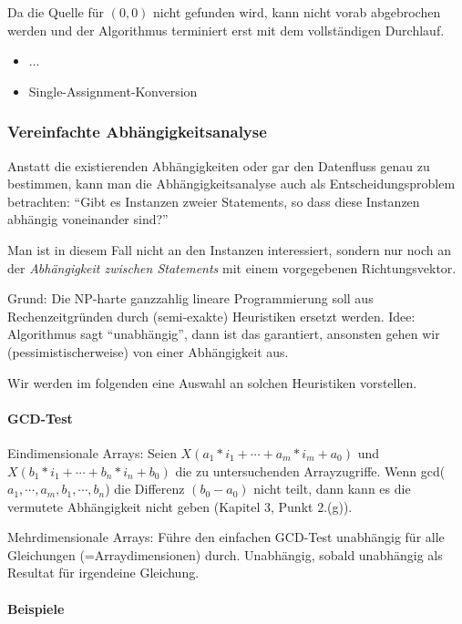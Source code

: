 Da die Quelle für \( (0,0) \) nicht gefunden wird, kann nicht vorab abgebrochen werden und der Algorithmus terminiert erst mit dem vollständigen Durchlauf.
    \begin{itemize}
        \item ...
        \item Single-Assignment-Konversion
    \end{itemize}

\subsubsection{Vereinfachte Abhängigkeitsanalyse}

Anstatt die existierenden Abhängigkeiten oder gar den Datenfluss genau
zu bestimmen, kann man die Abhängigkeitsanalyse auch als
Entscheidungsproblem betrachten: ``Gibt es Instanzen zweier
Statements, so dass diese Instanzen abhängig voneinander sind?''

Man ist in diesem Fall nicht an den Instanzen interessiert, sondern
nur noch an der \emph{Abhängigkeit zwischen Statements} mit einem
vorgegebenen Richtungsvektor.

Grund: Die NP-harte ganzzahlig lineare Programmierung soll aus
Rechenzeitgründen durch (semi-exakte) Heuristiken ersetzt werden.
Idee: Algorithmus sagt ``unabhängig'', dann ist das garantiert,
ansonsten gehen wir (pessimistischerweise) von einer Abhängigkeit aus.

Wir werden im folgenden eine Auswahl an solchen Heuristiken
vorstellen.


\paragraph{GCD-Test \cite{Ban93}}
Eindimensionale Arrays: Seien $X(a_1*i_1+\cdots+a_m*i_m+a_0)$ und
$X(b_1*i_1+\cdots+b_n*i_n+b_0)$ die zu untersuchenden Arrayzugriffe.
Wenn gcd($a_1,\cdots,a_m,b_1,\cdots,b_n$) die Differenz $(b_0-a_0)$
nicht teilt, dann kann es die vermutete Abhängigkeit nicht geben
(Kapitel 3, Punkt 2.(g)).

\smallskip

Mehrdimensionale Arrays: Führe den einfachen GCD-Test unabhängig für
alle Gleichungen (=Arraydimensionen) durch. Unabhängig, sobald
unabhängig als Resultat für irgendeine Gleichung.

\paragraph{Beispiele}

